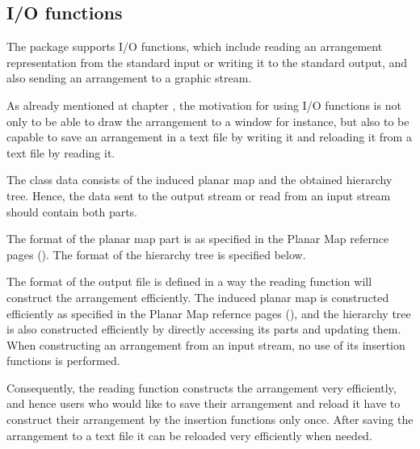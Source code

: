\begin{ccAdvanced}
\subsection*{I/O functions}
The  package supports I/O functions, which include reading an arrangement representation from 
the standard input or writing it to the standard output, 
and also sending an arrangement to a graphic stream.

As already mentioned at chapter , the motivation for using 
I/O functions is not only to be able to draw the arrangement 
to a window for instance, but also to be capable to save an arrangement 
in a text file by writing it and reloading it from a text file by reading it. 

The  class data consists of the induced planar map and the 
obtained hierarchy tree. Hence, the data sent to the output stream or 
read from an input stream should contain both parts. 
 
The format of the planar map part is as specified in the Planar Map 
refernce pages (). 
The format of the hierarchy tree is specified below.

The format of the output file is defined in a way the reading function 
will construct the arrangement efficiently. 
The induced planar map is constructed efficiently as specified in the Planar Map refernce pages (), and the hierarchy tree is also 
constructed efficiently by directly accessing its parts and updating them. 
When constructing an arrangement from an input stream, no use of its 
insertion functions is performed.
 
Consequently, the reading function constructs the arrangement very 
efficiently, and hence users who would like to save their arrangement and reload it have to construct their 
arrangement by the insertion functions only once.
After saving the arrangement to a text file it can be reloaded very efficiently when needed.


\end{ccAdvanced}
